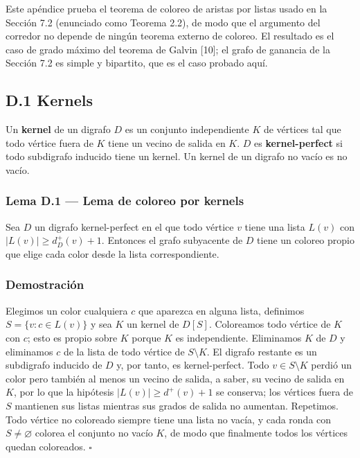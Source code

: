 \documentclass[
  spanish,
  11pt,
  a4paper,
]{article}
\begin{document}
Este apéndice prueba el teorema de coloreo de aristas por listas usado en la Sección 7.2 (enunciado como Teorema 2.2), de modo que el argumento del corredor no depende de ningún teorema externo de coloreo. El resultado es el caso de grado máximo del teorema de Galvin {[}10{]}; el grafo de ganancia de la Sección 7.2 es simple y bipartito, que es el caso probado aquí.

\subsection{D.1 Kernels}\label{d.1-kernels}

Un \textbf{kernel} de un digrafo \(D\) es un conjunto independiente \(K\) de vértices tal que todo vértice fuera de \(K\) tiene un vecino de salida en \(K\). \(D\) es \textbf{kernel-perfect} si todo subdigrafo inducido tiene un kernel. Un kernel de un digrafo no vacío es no vacío.

\subsubsection{Lema D.1 --- Lema de coloreo por kernels}\label{lema-d.1-lema-de-coloreo-por-kernels}

Sea \(D\) un digrafo kernel-perfect en el que todo vértice \(v\) tiene una lista \(L(v)\) con \(|L(v)|\ge d^+_D(v)+1\). Entonces el grafo subyacente de \(D\) tiene un coloreo propio que elige cada color desde la lista correspondiente.

\subsubsection{Demostración}\label{demostraciuxf3n-9}

Elegimos un color cualquiera \(c\) que aparezca en alguna lista, definimos \(S=\{v:c\in L(v)\}\) y sea \(K\) un kernel de \(D[S]\). Coloreamos todo vértice de \(K\) con \(c\); esto es propio sobre \(K\) porque \(K\) es independiente. Eliminamos \(K\) de \(D\) y eliminamos \(c\) de la lista de todo vértice de \(S\setminus K\). El digrafo restante es un subdigrafo inducido de \(D\) y, por tanto, es kernel-perfect. Todo \(v\in S\setminus K\) perdió un color pero también al menos un vecino de salida, a saber, su vecino de salida en \(K\), por lo que la hipótesis \(|L(v)|\ge d^+(v)+1\) se conserva; los vértices fuera de \(S\) mantienen sus listas mientras sus grados de salida no aumentan. Repetimos. Todo vértice no coloreado siempre tiene una lista no vacía, y cada ronda con \(S\ne\varnothing\) colorea el conjunto no vacío \(K\), de modo que finalmente todos los vértices quedan coloreados. \(\square\)
\end{document}
